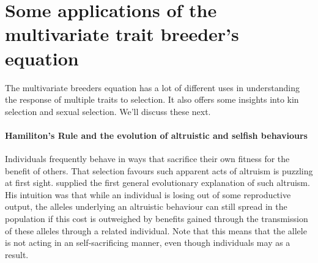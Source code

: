 \section{Some applications of the multivariate trait breeder's equation}

The multivariate breeders equation has a lot of different uses in understanding the response of multiple traits to selection. It also offers some insights into kin selection and sexual selection. We'll discuss these next.

\paragraph{Hamiliton's Rule and the evolution of altruistic and selfish behaviours}

Individuals frequently behave in ways that sacrifice their own fitness for the
benefit of others. That selection favours such apparent acts of altruism is puzzling at first sight. \citet{hamilton1964genetical,hamilton1964genetical2} supplied the first general evolutionary explanation of such altruism. 
His intuition was that while an individual is losing out of some reproductive output, the alleles underlying an altruistic behaviour can still spread in the population if this cost is outweighed by benefits gained 
through the transmission of these alleles through a related individual. Note that this means that the
allele is not acting in an self-sacrificing manner, even though individuals may as a result. 
